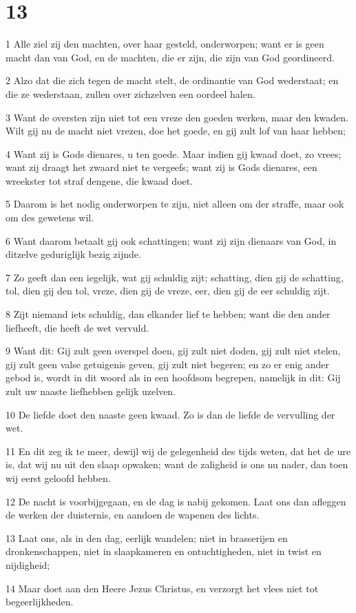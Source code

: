 \chapter{13}

\par 1 Alle ziel zij den machten, over haar gesteld, onderworpen; want er is geen macht dan van God, en de machten, die er zijn, die zijn van God geordineerd.
\par 2 Alzo dat die zich tegen de macht stelt, de ordinantie van God wederstaat; en die ze wederstaan, zullen over zichzelven een oordeel halen.
\par 3 Want de oversten zijn niet tot een vreze den goeden werken, maar den kwaden. Wilt gij nu de macht niet vrezen, doe het goede, en gij zult lof van haar hebben;
\par 4 Want zij is Gods dienares, u ten goede. Maar indien gij kwaad doet, zo vrees; want zij draagt het zwaard niet te vergeefs; want zij is Gods dienares, een wreekster tot straf dengene, die kwaad doet.
\par 5 Daarom is het nodig onderworpen te zijn, niet alleen om der straffe, maar ook om des gewetens wil.
\par 6 Want daarom betaalt gij ook schattingen; want zij zijn dienaars van God, in ditzelve geduriglijk bezig zijnde.
\par 7 Zo geeft dan een iegelijk, wat gij schuldig zijt; schatting, dien gij de schatting, tol, dien gij den tol, vreze, dien gij de vreze, eer, dien gij de eer schuldig zijt.
\par 8 Zijt niemand iets schuldig, dan elkander lief te hebben; want die den ander liefheeft, die heeft de wet vervuld.
\par 9 Want dit: Gij zult geen overspel doen, gij zult niet doden, gij zult niet stelen, gij zult geen valse getuigenis geven, gij zult niet begeren; en zo er enig ander gebod is, wordt in dit woord als in een hoofdsom begrepen, namelijk in dit: Gij zult uw naaste liefhebben gelijk uzelven.
\par 10 De liefde doet den naaste geen kwaad. Zo is dan de liefde de vervulling der wet.
\par 11 En dit zeg ik te meer, dewijl wij de gelegenheid des tijds weten, dat het de ure is, dat wij nu uit den slaap opwaken; want de zaligheid is ons nu nader, dan toen wij eerst geloofd hebben.
\par 12 De nacht is voorbijgegaan, en de dag is nabij gekomen. Laat ons dan afleggen de werken der duisternis, en aandoen de wapenen des lichts.
\par 13 Laat ons, als in den dag, eerlijk wandelen; niet in brasserijen en dronkenschappen, niet in slaapkameren en ontuchtigheden, niet in twist en nijdigheid;
\par 14 Maar doet aan den Heere Jezus Christus, en verzorgt het vlees niet tot begeerlijkheden.

